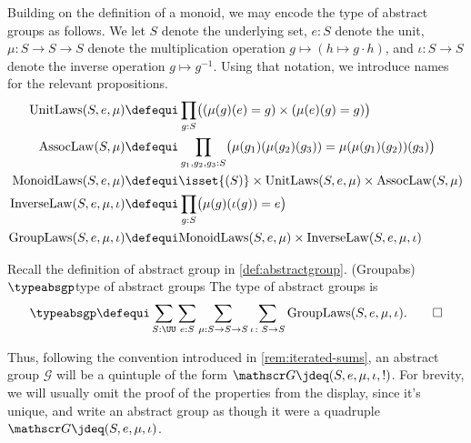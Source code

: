   Building on the definition of a monoid, we may encode the type of abstract 
  groups as follows. We let $S$ denote the underlying set, $e : S$ denote the unit, 
  $\mu:S\to S\to S$ denote the multiplication operation 
  $g\mapsto (h \mapsto g\cdot h)$, and $\iota : S \to S$ denote 
  the inverse operation $g \mapsto g^{-1}$.  Using
  that notation, we introduce names for the relevant propositions.
  \begin{align*}
    \mathrm{UnitLaws}(S,e,\mu)   & \defequi
    \prod_{g:S} \bigl((\mu{}(g)(e) = g)\times(\mu{}(e)(g) = g) \bigr)\\
    \mathrm{AssocLaw}(S,\mu{})   & \defequi\prod_{g_1,g_2,g_3:S} 
    \bigl( \mu{}(g_1)(\mu{}(g_2)(g_3))=\mu{}(\mu{}(g_1)(g_2))(g_3) \bigr)\\
    \mathrm{MonoidLaws}(S,e,\mu) & \defequi \isset{(S)} 
    \times \mathrm{UnitLaws}(S,e,\mu) \times \mathrm{AssocLaw}(S,\mu{}) \\
    \mathrm{InverseLaw}(S,e,\mu,\iota) & \defequi 
    \prod_{g:S}\bigl( \mu(g)(\iota(g)) = e \bigr) \\
    \mathrm{GroupLaws}(S,e,\mu,\iota) & \defequi 
    \mathrm{MonoidLaws}(S,e,\mu) \times \mathrm{InverseLaw}(S,e,\mu,\iota)
  \end{align*}

\begin{definition}
  \label{def:type-abstrgp}
  Recall the definition of abstract group in \cref{def:abstractgroup}.
  \glossary(Groupabs){$\protect\typeabsgp$}{type of abstract groups}
  The type of abstract groups is
  \[
    \typeabsgp \defequi \sum_{S:\UU} \sum_{e:S}\sum_{\mu{}:S\to S\to S}
    \sum_{\iota\colon S\to S} \mathrm{GroupLaws}(S,e,\mu,\iota).\qedhere
  \]
\end{definition}

  Thus, following the convention introduced in \cref{rem:iterated-sums},
  an abstract group $\mathscr G$ will be a quintuple of the form
  $\mathscr G \jdeq (S,e,\mu,\iota,!)$.  For brevity, we will usually 
  omit the proof of the properties from the display, since it's unique,
  and write an abstract group as though it were a quadruple 
  $\mathscr G \jdeq (S,e,\mu,\iota)$.


